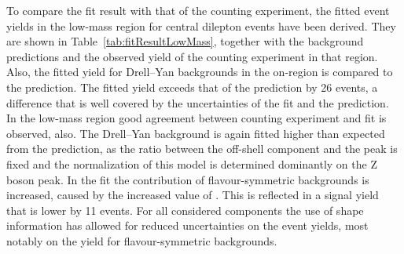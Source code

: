 To compare the fit result with that of the counting experiment, the fitted event yields in the low-mass region for central dilepton events have been derived. They are shown in Table~\ref{tab:fitResultLowMass}, together with the background predictions and the observed yield of the counting experiment in that region. Also, the fitted yield for Drell--Yan backgrounds  in the on-\Z region is compared to the prediction. The fitted yield exceeds that of the prediction by 26 events, a difference that is well covered by the uncertainties of the fit and the prediction. In the low-mass region good agreement between counting experiment and fit is observed, also. The Drell--Yan background is again fitted higher than expected from the prediction, as the ratio between the off-shell component and the peak is fixed and the normalization of this model is determined dominantly on the Z boson peak. In the fit the contribution of flavour-symmetric backgrounds is increased, caused by the increased value of \Rsfof. This is reflected in a signal yield that is lower by 11 events. For all considered components the use of shape information has allowed for reduced uncertainties on the event yields, most notably on the yield for flavour-symmetric backgrounds. 

